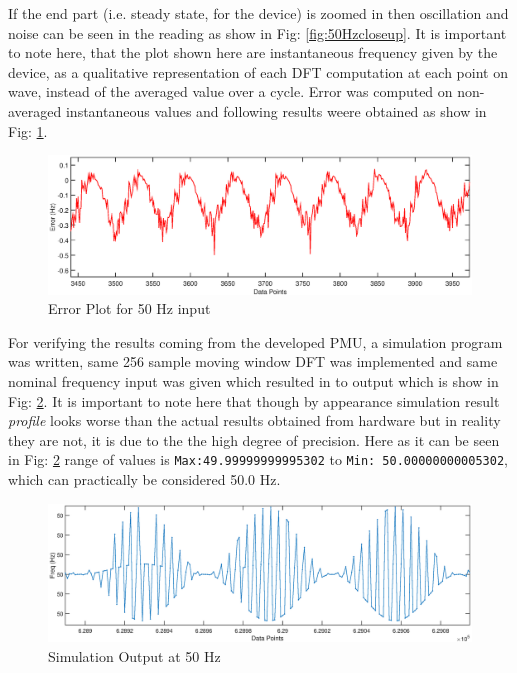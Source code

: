 If the end part (i.e. steady state, for the device) is zoomed in then oscillation and noise can be seen in the reading as show in Fig: \ref{fig:50Hzcloseup}. It is important to note here, that the plot shown here are instantaneous frequency given by the device, as a qualitative representation of each DFT computation at each point on wave, instead of the averaged value over a cycle. Error was computed on non-averaged instantaneous values and following results weere obtained as show in Fig: \ref{fig:50Hz error}.

\begin{figure}[h]
	\includegraphics[width=\textwidth]{fig/50Hz_freq_error_closeup.eps}
	\caption{Error Plot for 50 Hz input}
	\label{fig:50Hz error}
\end{figure}
For verifying the results coming from the developed PMU, a simulation program was written, same 256 sample moving window DFT was implemented and same nominal frequency input was given which resulted in to output which is show in Fig: \ref{fig:50Hz simulation}. It is important to note here that though by appearance simulation result \textit{profile} looks worse than the actual results obtained from hardware but in reality they are not, it is due to the the high degree of precision. Here as it can be seen in Fig: \ref{fig:50Hz simulation} range of values is  \texttt{Max:49.99999999995302} to \texttt{Min: 50.00000000005302}, which can practically be considered 50.0 Hz. 
\begin{figure}[h]
	\includegraphics[width=\textwidth]{fig/50Hz_simulated.eps}
	\caption{Simulation Output at 50 Hz}
	\label{fig:50Hz simulation}
\end{figure}
   
